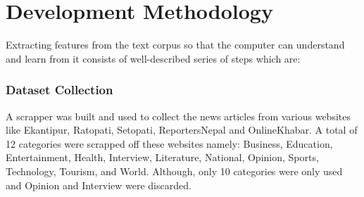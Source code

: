 \documentclass[12pt]{report}
\begin{document}
    \section{Development Methodology}

        Extracting features from the text corpus so that the computer can understand and learn from it consists of well-described
        series of steps which are:
        

        
        \subsubsection{Dataset Collection}
            A scrapper was built and used to collect the news articles from various websites like Ekantipur, Ratopati, Setopati, ReportersNepal and OnlineKhabar.
            A total of 12 categories were scrapped off these websites namely: Business, Education, Entertainment, Health, Interview, 
            Literature, National, Opinion, Sports, Technology, Tourism, and World. Although, only 10 categories were only used and Opinion and Interview were discarded.
\end{document}
